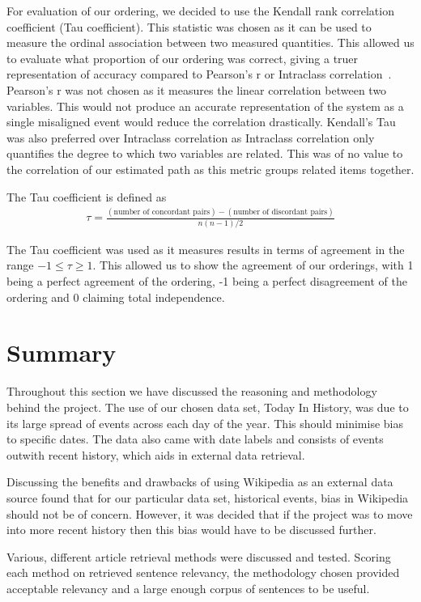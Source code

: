 \documentclass[bsc,frontabs,twoside,singlespacing,parskip,deptreport]{infthesis}     %
\begin{document}
For evaluation of our ordering, we decided to use the Kendall rank correlation coefficient (Tau coefficient).
This statistic was chosen as it can be used to measure the ordinal association between two measured quantities.
This allowed us to evaluate what proportion of our ordering was correct, giving a truer representation of accuracy
compared to Pearson's r or Intraclass correlation~\cite{chok2010pearson}.
Pearson's r was not chosen as it measures the linear correlation between two variables.
This would not produce an accurate representation of the system as a single misaligned event would reduce the
correlation drastically.
Kendall's Tau was also preferred over Intraclass correlation as Intraclass correlation only quantifies the
degree to which two variables are related. This was of no value to the correlation of our estimated path
as this metric groups related items together.


The Tau coefficient is defined as
\begin{eqnarray}
  \tau=\frac{(\text{number of concordant pairs})-(\text{number of discordant pairs})}{n(n-1)/2}\nonumber
\end{eqnarray}\cite{abdi2007kendall}

The Tau coefficient was used as it measures results in terms of agreement in the range $-1 \leq \tau \geq 1$.
This allowed us to show the agreement of our orderings, with 1 being a perfect agreement of the ordering, -1 being a perfect disagreement of the ordering and 0 claiming
total independence.


\section{Summary}
Throughout this section we have discussed the reasoning and methodology behind the project.
The use of our chosen data set, Today In History, was due to its large spread of events across
each day of the year. This should minimise bias to specific dates. The data also came with date labels and
consists of events outwith recent history, which aids in external data retrieval.

Discussing the benefits and drawbacks of using Wikipedia as an external data source found that
for our particular data set, historical events, bias in Wikipedia should not be of concern.
However, it was decided that if the project was to move into more recent history then this bias would
have to be discussed further.

Various, different article retrieval methods were discussed and tested.
Scoring each method on retrieved sentence relevancy, the methodology chosen provided acceptable relevancy
and a large enough corpus of sentences to be useful.
\end{document}
